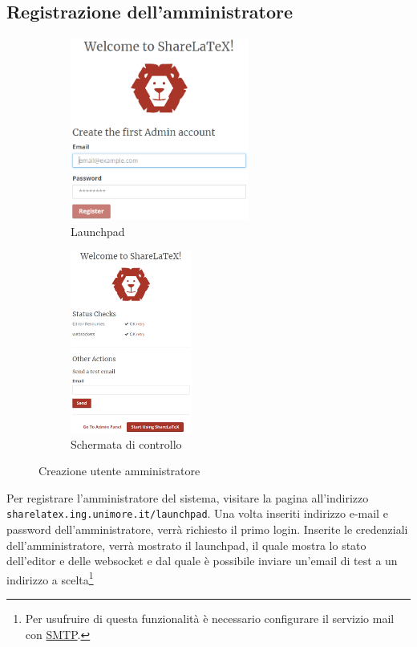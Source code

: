 \subsection{Registrazione dell'amministratore}
\begin{figure}[h]
    \begin{subfigure}{0.5\textwidth}
        \centering
        \includegraphics[height=6cm]{immagini/launchpad_1.png}
        \caption{Launchpad}
        \label{fig:sharelatex_launchpad_1}
    \end{subfigure}
    \begin{subfigure}{0.5\textwidth}
        \centering
        \includegraphics[height=6cm]{immagini/launchpad_2.png}
        \caption{Schermata di controllo}
        \label{fig:sharelatex_launchpad_2}
    \end{subfigure}
    \caption{Creazione utente amministratore}
    \label{fig:sharelatex_launchpad}
\end{figure}
\noindent Per registrare l'amministratore del sistema, visitare la pagina all'indirizzo\\\verb|sharelatex.ing.unimore.it/launchpad|. Una volta inseriti indirizzo e-mail e password dell'amministratore, verrà richiesto il primo login. Inserite le credenziali dell'amministratore, verrà mostrato il launchpad, il quale mostra lo stato dell'editor e delle websocket e dal quale è possibile inviare un'email di test a un indirizzo a scelta\footnote{Per usufruire di questa funzionalità è necessario configurare il servizio mail con \hyperref[SMTP]{SMTP}.}

